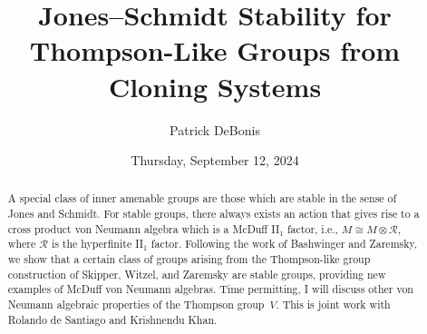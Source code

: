 \documentclass{UAmathtalk}
\author{Patrick DeBonis}
\title{Jones–Schmidt Stability for Thompson-Like Groups from Cloning Systems}
\date{Thursday, September 12, 2024}
\begin{document}
\maketitle

\begin{abstract}
A special class of inner amenable groups are those which are stable in the sense of Jones and Schmidt. For stable groups, there always exists an action that gives rise to a cross product von Neumann algebra which is a McDuff II$_1$ factor, i.e., $M \cong M \otimes \mathcal{R},$ where $\mathcal{R}$ is the hyperfinite II$_1$ factor. Following the work of Bashwinger and Zaremsky, we show that a certain class of groups arising from the Thompson-like group construction of Skipper, Witzel, and Zaremsky are stable groups, providing new examples of McDuff von Neumann algebras. Time permitting, I will discuss other von Neumann algebraic properties of the Thompson group~$V$. This is joint work with Rolando de Santiago and Krishnendu Khan.
\end{abstract}
\end{document}
